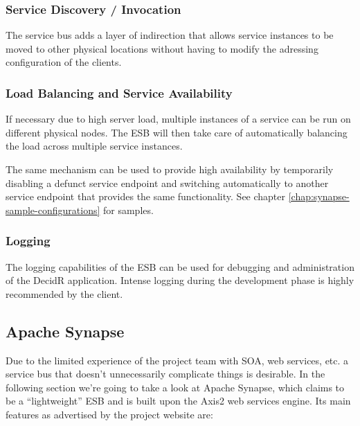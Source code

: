 \subsubsection{Service Discovery / Invocation}
\label{subsec:service-discovery-incovation}

The service bus adds a layer of indirection that allows service instances to be
moved to other physical locations without having to modify the adressing
configuration of the clients.


\newpage
\subsubsection{Load Balancing and Service Availability}
\label{subsec:load-balancing-and-service-availability}
If necessary due to high server load, multiple instances of a service can be
run on different physical nodes. The ESB will then take care of
automatically balancing the load across multiple service instances.

The same mechanism can be used to provide high availability by temporarily
disabling a defunct service endpoint and switching automatically to another
service endpoint that provides the same functionality. See chapter
\ref{chap:synapse-sample-configurations} for samples.

\subsubsection{Logging}
\label{subsec:logging}
The logging capabilities of the ESB can be used for debugging and
administration of the DecidR application. Intense logging during the
development phase is highly recommended by the client.

\subsection{Apache Synapse}
\label{sec:apache-synapse}

Due to the limited experience of the project team with SOA, web services, etc.
a service bus that doesn't unnecessarily complicate things is desirable. In
the following section we're going to take a look at Apache Synapse, which
claims to be a ``lightweight'' ESB and is built upon the Axis2 web services
engine. Its main features as advertised by the project website are:

